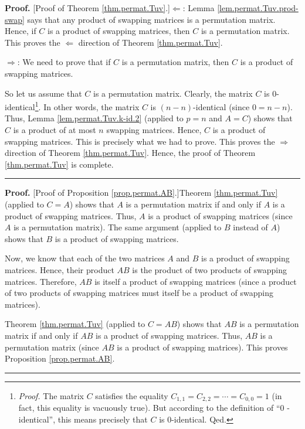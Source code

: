 \documentclass[numbers=enddot,12pt,final,onecolumn,notitlepage]{scrartcl}%
\theoremstyle{definition}
\newenvironment{proof}[1][Proof]{\noindent\textbf{#1.} }{\ \rule{0.5em}{0.5em}}
\begin{document}
\begin{proof}
[Proof of Theorem \ref{thm.permat.Tuv}.]$\Longleftarrow$: Lemma
\ref{lem.permat.Tuv.prod-swap} says that any product of swapping matrices is a
permutation matrix. Hence, if $C$ is a product of swapping matrices, then $C$
is a permutation matrix. This proves the $\Longleftarrow$ direction of Theorem
\ref{thm.permat.Tuv}.

$\Longrightarrow$: We need to prove that if $C$ is a permutation matrix, then
$C$ is a product of swapping matrices.

So let us assume that $C$ is a permutation matrix. Clearly, the matrix $C$ is
$0$-identical\footnote{\textit{Proof.} The matrix $C$ satisfies the equality
$C_{1,1}=C_{2,2}=\cdots=C_{0,0}=1$ (in fact, this equality is vacuously true).
But according to the definition of \textquotedblleft$0$%
-identical\textquotedblright, this means precisely that $C$ is $0$-identical.
Qed.}. In other words, the matrix $C$ is $\left(  n-n\right)  $-identical
(since $0=n-n$). Thus, Lemma \ref{lem.permat.Tuv.k-id.2} (applied to $p=n$ and
$A=C$) shows that $C$ is a product of at most $n$ swapping matrices. Hence,
$C$ is a product of swapping matrices. This is precisely what we had to prove.
This proves the $\Longrightarrow$ direction of Theorem \ref{thm.permat.Tuv}.
Hence, the proof of Theorem \ref{thm.permat.Tuv} is complete.
\end{proof}

\begin{proof}
[Proof of Proposition \ref{prop.permat.AB}.]Theorem \ref{thm.permat.Tuv}
(applied to $C=A$) shows that $A$ is a permutation matrix if and only if $A$
is a product of swapping matrices. Thus, $A$ is a product of swapping matrices
(since $A$ is a permutation matrix). The same argument (applied to $B$ instead
of $A$) shows that $B$ is a product of swapping matrices.

Now, we know that each of the two matrices $A$ and $B$ is a product of
swapping matrices. Hence, their product $AB$ is the product of two products of
swapping matrices. Therefore, $AB$ is itself a product of swapping matrices
(since a product of two products of swapping matrices must itself be a product
of swapping matrices).

Theorem \ref{thm.permat.Tuv} (applied to $C=AB$) shows that $AB$ is a
permutation matrix if and only if $AB$ is a product of swapping matrices.
Thus, $AB$ is a permutation matrix (since $AB$ is a product of swapping
matrices). This proves Proposition \ref{prop.permat.AB}.
\end{proof}
\end{document}
